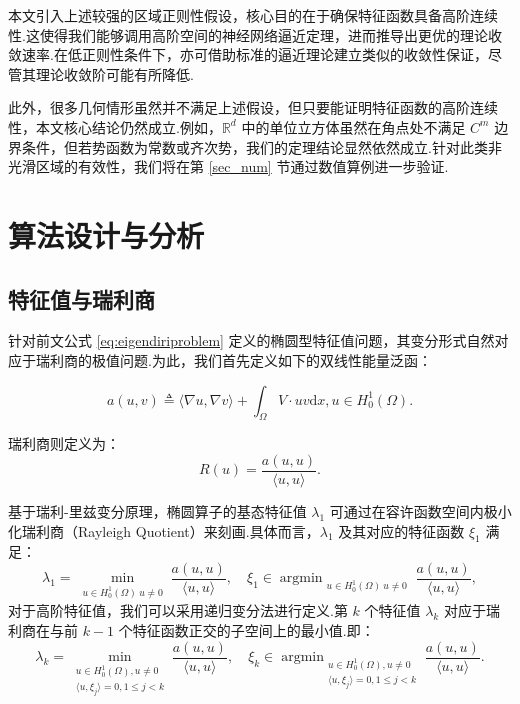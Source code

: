 本文引入上述较强的区域正则性假设，核心目的在于确保特征函数具备高阶连续性.这使得我们能够调用高阶空间的神经网络逼近定理，进而推导出更优的理论收敛速率.在低正则性条件下，亦可借助标准的逼近理论建立类似的收敛性保证，尽管其理论收敛阶可能有所降低.

此外，很多几何情形虽然并不满足上述假设，但只要能证明特征函数的高阶连续性，本文核心结论仍然成立.例如，$\mathbb{R}^{d}$ 中的单位立方体虽然在角点处不满足 $C^m$ 边界条件，但若势函数为常数或齐次势，我们的定理结论显然依然成立.针对此类非光滑区域的有效性，我们将在第 \ref{sec_num} 节通过数值算例进一步验证.

\section{算法设计与分析}
\subsection{特征值与瑞利商}\label{sec_model}
针对前文公式 \eqref{eq:eigendiriproblem} 定义的椭圆型特征值问题，其变分形式自然对应于瑞利商的极值问题.为此，我们首先定义如下的双线性能量泛函：

\begin{equation*}
a(u,v)\triangleq\langle \nabla u,\nabla v\rangle+\int_{\Omega}V\cdot uv \text{d}x, u\in H_{0}^{1}(\Omega).
\end{equation*}

瑞利商则定义为：
\begin{equation*}
R(u) = \frac{a(u,u)}{\langle u, u \rangle}.
\end{equation*}

基于瑞利-里兹变分原理，椭圆算子的基态特征值 $\lambda_1$ 可通过在容许函数空间内极小化瑞利商（Rayleigh Quotient）来刻画.具体而言，$\lambda_1$ 及其对应的特征函数 $\xi_1$ 满足：
\begin{equation}\label{eq:first_eigen}
\lambda_1 = \min_{\substack{u \in H_0^1(\Omega) \ u \neq 0}} \frac{a(u,u)}{\langle u, u \rangle}, \quad \xi_1 \in \mathop{\arg\min}_{\substack{u \in H_0^1(\Omega) \ u \neq 0}} \frac{a(u,u)}{\langle u, u \rangle},
\end{equation}
对于高阶特征值，我们可以采用递归变分法进行定义.第 $k$ 个特征值 $\lambda_k$ 对应于瑞利商在与前 $k-1$ 个特征函数正交的子空间上的最小值.即：
\begin{equation}\label{eq:ktheigenvalue}
\lambda_k = \min_{\substack{u \in H_0^1(\Omega), u \neq 0 \\ \langle u,\xi_j\rangle=0, 1 \le j < k}} \frac{a(u,u)}{\langle u, u \rangle}, \quad \xi_k \in \mathop{\arg\min}_{\substack{u \in H_0^1(\Omega), u \neq 0 \\ \langle u,\xi_j\rangle=0, 1 \le j < k}} \frac{a(u,u)}{\langle u, u \rangle}.
\end{equation}

